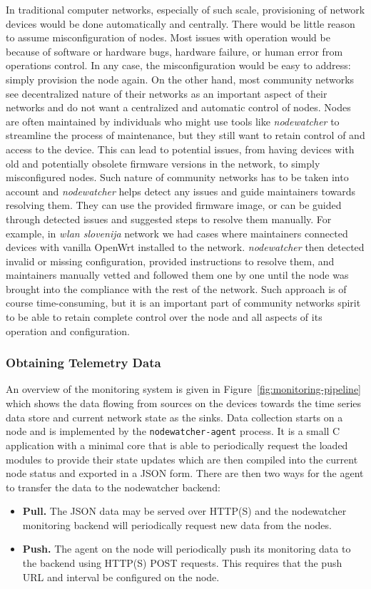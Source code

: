 \documentclass[5p,sort&compress]{elsarticle}
\newcommand{\nodewatcher}{\textit{nodewatcher}}
\newcommand{\wlanslovenija}{\textit{wlan slovenija}}
\begin{document}
In traditional computer networks, especially of such scale, provisioning of network devices would be done automatically and centrally.
There would be little reason to assume misconfiguration of nodes.
Most issues with operation would be because of software or hardware bugs, hardware failure, or human error from operations control.
In any case, the misconfiguration would be easy to address: simply provision the node again.
On the other hand, most community networks see decentralized nature of their networks as an important aspect of their networks and do not want a centralized and automatic control of nodes.
Nodes are often maintained by individuals who might use tools like \nodewatcher{} to streamline the process of maintenance, but they still want to retain control of and access to the device.
This can lead to potential issues, from having devices with old and potentially obsolete firmware versions in the network, to simply misconfigured nodes.
Such nature of community networks has to be taken into account and \nodewatcher{} helps detect any issues and guide maintainers towards resolving them.
They can use the provided firmware image, or can be guided through detected issues and suggested steps to resolve them manually.
For example, in \wlanslovenija{} network we had cases where maintainers connected devices with vanilla OpenWrt installed to the network.
\nodewatcher{} then detected invalid or missing configuration, provided instructions to resolve them, and maintainers manually vetted and followed them one by one until the node was brought into the compliance with the rest of the network.
Such approach is of course time-consuming, but it is an important part of community networks spirit to be able to retain complete control over the node and all aspects of its operation and configuration.

\subsubsection{Obtaining Telemetry Data}

An overview of the monitoring system is given in Figure~\ref{fig:monitoring-pipeline} which shows the data flowing from sources on the devices towards the time series data store and current network state as the sinks.
Data collection starts on a node and is implemented by the \texttt{nodewatcher-agent} process.
It is a small C application with a minimal core that is able to periodically request the loaded modules to provide their state updates which are then compiled into the current node status and exported in a JSON form.
There are then two ways for the agent to transfer the data to the nodewatcher backend:
\begin{itemize}
    \item \textbf{Pull.} The JSON data may be served over HTTP(S) and the nodewatcher monitoring backend will periodically request new data from the nodes.

    \item \textbf{Push.} The agent on the node will periodically push its monitoring data to the backend using HTTP(S) POST requests. This requires that the push URL and interval be configured on the node.
\end{itemize}
\end{document}
